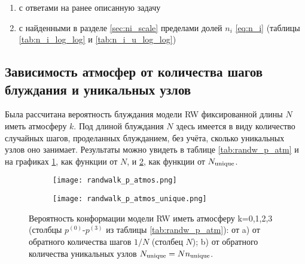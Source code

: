 \begin{enumerate}
\item с ответами на ранее описанную задачу \cite{Spitser1969}
\item с найденными в разделе \ref{sec:ni_scale} пределами долей $n_i$ \eqref{eq:n_i} (таблицы \ref{tab:n_i_log_log} и \ref{tab:n_i_u_log_log})
\end{enumerate}

\newpage

\subsection{Зависимость атмосфер от количества шагов блуждания и уникальных узлов}

Была рассчитана вероятность блуждания модели RW фиксированной длины $N$ иметь атмосферу $k$. 
Под длиной блуждания $N$ здесь имеется в виду количество случайных шагов, проделанных блужданием, без учёта, сколько уникальных узлов оно занимает.
Результаты можно увидеть в таблице \ref{tab:randw_p_atm} и на графиках \ref{fig:randw_p_atm}, как функции от $N$, и \ref{fig:randw_p_atm_u}, как функции от $N_{\textup{unique}}$.

\begin{figure}[h]
    
\begin{subfigure}{0.49\textwidth}
\texttt{[image: randwalk\_p\_atmos.png]}
\caption{}
\label{fig:randw_p_atm}
\end{subfigure}
\hfill
\begin{subfigure}{0.49\textwidth}
\texttt{[image: randwalk\_p\_atmos\_unique.png]}
\caption{}
\label{fig:randw_p_atm_u}
\end{subfigure}
\caption{Вероятность конформации модели RW  иметь атмосферу k=0,1,2,3  (столбцы $p^{(0)}$-$p^{(3)}$ из таблицы \ref{tab:randw_p_atm}): от a) от обратного количества шагов $1/N$ (столбец $N$); b) от обратного количества уникальных узлов $N_{\textup{unique}} = Nn_{\textup{unique}}$.}
\label{fig:randw_p_full}
\end{figure} 

